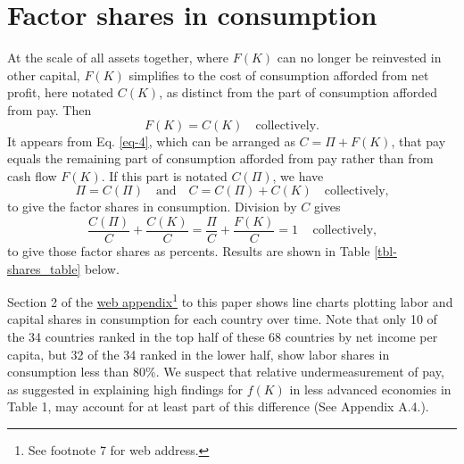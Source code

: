 \documentclass[a4paper,fleqn]{cas-sc}
\begin{document}


\section{Factor shares in consumption}

At the scale of all assets together, where $F(K)$ can no longer be reinvested in other capital, $F(K)$ simplifies to the cost of consumption afforded from net profit, here notated $C(K)$, as distinct from the part of consumption afforded from pay. Then 
%
\begin{equation}
F(K) = C(K) \quad \text{collectively.} \label{eq-7}
\end{equation}
%
It appears from Eq. \eqref{eq-4}, which can be arranged as $C = \Pi + F(K)$, that pay equals the remaining part of consumption afforded from pay rather than from cash flow $F(K)$. If this part is notated $C(\Pi)$, we have
\begin{equation}
\Pi = C(\Pi) \quad \text{and} \quad C = C(\Pi) + C(K) \quad \text{collectively,} \label{eq-8}
\end{equation}
to give the factor shares in consumption. Division by \(C\) gives
\begin{equation}
\frac{C(\Pi)}{C} + \frac{C(K)}{C} = \frac{\Pi}{C} + \frac{F(K)}{C} = 1 \, \quad \text{collectively,} \label{eq-9}
\end{equation}
to give those factor shares as percents. Results are shown in Table \ref{tbl-shares_table} below.

\FloatBarrier

\FloatBarrier

Section 2 of the \href{https://web-appendix.quarto.pub/separate-way-to-measure-rate-of-return/}{web appendix}\footnote{See footnote 7 for web address.} to this paper shows line charts plotting labor and capital shares in consumption for each country over time. Note that only 10 of the 34 countries ranked in the top half of these 68 countries by net income per capita, but 32 of the 34 ranked in the lower half, show labor shares in consumption less than 80\%. We suspect that relative undermeasurement of pay, as suggested in explaining high findings for \(f(K)\) in less advanced economies in Table 1, may account for at least part of this difference (See Appendix A.4.).
\end{document}
